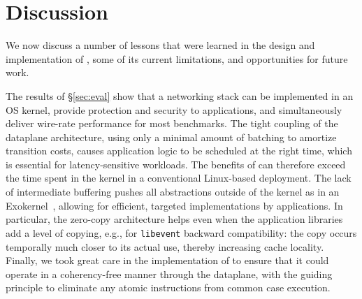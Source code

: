 
\section{Discussion}
\label{sec:disc}

We now discuss a number of lessons that were learned in the design and
implementation of \ix, some of its current limitations, and
opportunities for future work.

 The results of \S\ref{sec:eval}
show that a networking stack can be implemented in an OS kernel,
provide protection and security to applications, and simultaneously
deliver wire-rate performance for most benchmarks.  The tight coupling
of the dataplane architecture, using only a minimal amount of batching
to amortize transition costs, causes application logic to be scheduled
at the right time, which is essential for latency-sensitive workloads.
The benefits of \ix can therefore exceed the time spent in the kernel 
in a conventional Linux-based deployment.  The lack of intermediate
buffering pushes all abstractions outside of the kernel as in an
Exokernel~\cite{DBLP:conf/sosp/EnglerKO95}, allowing for efficient,
targeted implementations by applications.  In particular, the
zero-copy architecture helps even when the application libraries add a
level of copying, e.g., for \texttt{libevent} backward compatibility:
the copy occurs temporally much closer to its actual use, thereby
increasing cache locality.  Finally, we took great care in the
implementation of \ix to ensure that it could operate in a
coherency-free manner through the dataplane, with the guiding
principle to eliminate any atomic instructions from common case
execution.




